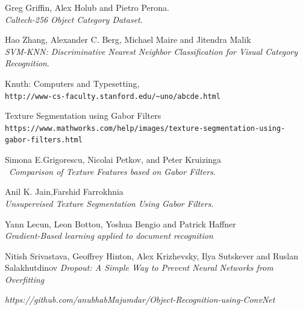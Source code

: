 \documentclass{article} %
\begin{document}


\begin{thebibliography}{9}

Greg Griffin, Alex Holub and Pietro Perona. \\
\textit{Caltech-256 Object Category Dataset}. 
 
Hao Zhang, Alexander C. Berg, Michael Maire and Jitendra Malik \\
\textit{SVM-KNN: Discriminative Nearest Neighbor Classification for Visual Category
Recognition}.
 
Knuth: Computers and Typesetting,
\\\texttt{http://www-cs-faculty.stanford.edu/\~{}uno/abcde.html}

Texture Segmentation using Gabor Filters
\\\texttt{https://www.mathworks.com/help/images/texture-segmentation-using-gabor-filters.html}

Simona E.Grigorescu, Nicolai Petkov, and Peter Kruizinga\\\
\textit{Comparison of Texture Features based on Gabor Filters}. 

Anil K. Jain,Farshid Farrokhnia
\\
\textit{Unsupervised Texture Segmentation Using Gabor
Filters}. 

Yann Lecun, Leon Bottou, Yoshua Bengio and Patrick Haffner \\
\textit{Gradient-Based learning applied to document recognition}

Nitish Srivastava,
Geoffrey Hinton,
Alex Krizhevsky,
Ilya Sutskever and
Ruslan Salakhutdinov 
\textit{Dropout: A Simple Way to Prevent Neural Networks from Overfitting}

\textit{https://github.com/anubhabMajumdar/Object-Recognition-using-ConvNet}

\end{thebibliography}
\end{document}
